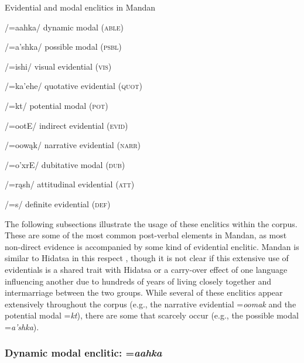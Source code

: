 \begin{exe}

\item\label{listofevidentials} Evidential and modal enclitics in Mandan

\begin{xlist}

	\item /=aahka/ dynamic modal (\textsc{able})
	\item /=a'shka/ possible modal (\textsc{psbl})
	\item /=ishi/ visual evidential (\textsc{vis})
	\item /=ka'ehe/ quotative evidential (\textsc{quot})
	\item /=kt/	potential modal (\textsc{pot})
        \item /=ootE/	indirect evidential (\textsc{evid})
	\item /=oowąk/ narrative evidential (\textsc{narr})
	\item /=o'xrE/ dubitative modal (\textsc{dub})
	\item /=rąsh/ attitudinal evidential (\textsc{att})
	\item /=s/ definite evidential (\textsc{def})

\end{xlist}

\end{exe}

The following subsections illustrate the usage of these enclitics within the corpus. These are some of the most common post-verbal elements in Mandan, as most non-direct evidence is accompanied by some kind of evidential enclitic. Mandan is similar to Hidatsa in this respect \citep[220]{park2012}, though it is not clear if this extensive use of evidentials is a shared trait with Hidatsa or a carry-over effect of one language influencing another due to hundreds of years of living closely together and intermarriage between the two groups. While several of these enclitics appear extensively throughout the corpus (e.g., the narrative evidential =\textit{oomak} and the potential modal =\textit{kt}), there are some that scarcely occur (e.g., the possible modal =\textit{a'shka}).

\subsubsection{Dynamic modal enclitic: =\textit{aahka}}

